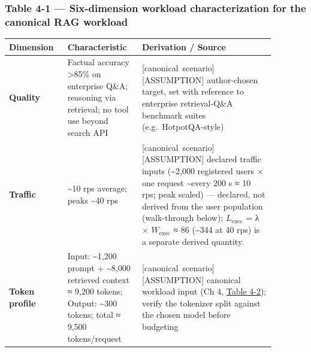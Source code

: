 \subsubsection{Table 4-1 --- Six-dimension workload characterization for
the canonical RAG
workload}\label{table-4-1-six-dimension-workload-characterization-for-the-canonical-rag-workload}

\nopagebreak[4]
\begin{longtable}[]{@{}
  >{\raggedright\arraybackslash}p{0.1942\linewidth}
  >{\raggedright\arraybackslash}p{0.2331\linewidth}
  >{\raggedright\arraybackslash}p{0.4507\linewidth}@{}}
\toprule\noalign{}
\begin{minipage}[b]{\linewidth}\raggedright
Dimension
\end{minipage} & \begin{minipage}[b]{\linewidth}\raggedright
Characteristic
\end{minipage} & \begin{minipage}[b]{\linewidth}\raggedright
Derivation / Source
\end{minipage} \\
\midrule\noalign{}
\endhead
\bottomrule\noalign{}
\endlastfoot
\textbf{Quality} & Factual accuracy \textgreater85\% on enterprise Q\&A;
reasoning via retrieval; no tool use beyond search API & \mbox{{[}canonical
scenario{]}}\hspace{0pt}\mbox{{[}ASSUMPTION{]}} author-chosen target, set with reference to
enterprise retrieval-Q\&A benchmark suites (e.g.~HotpotQA-style) \\
\noalign{\label{tab:4.1}}
\textbf{Traffic} & \textasciitilde10 rps average; peaks
\textasciitilde40 rps & \mbox{{[}canonical scenario{]}}\hspace{0pt}\mbox{{[}ASSUMPTION{]}}
declared traffic inputs (\textasciitilde2,000 registered users × one
request \textasciitilde every 200 s ≈ 10 rps; peak scaled) --- declared,
not derived from the user population (walk-through below);
\(L_{\mathrm{exec}}\) = λ × \(W_{\mathrm{exec}}\) ≈ 86
(\textasciitilde344 at 40 rps) is a separate derived quantity. \\
\textbf{Token profile} & Input: \textasciitilde1,200 prompt +
\textasciitilde8,000 retrieved context ≈ 9,200 tokens; Output:
\textasciitilde300 tokens; total ≈ 9,500 tokens/request & \mbox{{[}canonical
scenario{]}}\hspace{0pt}\mbox{{[}ASSUMPTION{]}} canonical workload input (Ch 4, \hyperref[tab:4.2]{Table 4-2});
verify the tokenizer split against the chosen model before budgeting \\

\end{longtable}
